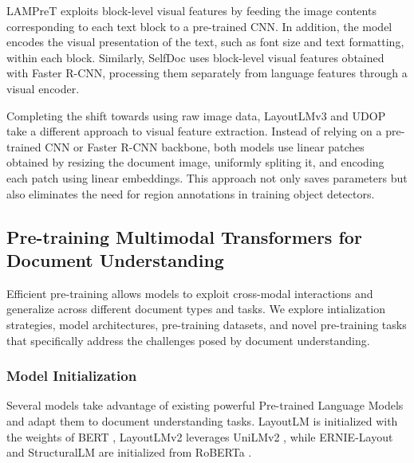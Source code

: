 \ac{LAMPreT} \citep{wu2021lampret} exploits block-level visual features by feeding the image contents corresponding to each text block to a pre-trained \ac{CNN}. In addition, the model encodes the visual presentation of the text, such as font size and text formatting, within each block. Similarly, SelfDoc \citep{li2021selfdoc} uses block-level visual features obtained with Faster R-CNN, processing them separately from language features through a visual encoder.  

Completing the shift towards using raw image data, LayoutLMv3 \citep{huang2022layoutlmv3} and UDOP \citep{tang2023unifying} take a different approach to visual feature extraction. Instead of relying on a pre-trained \ac{CNN} or Faster R-CNN backbone, both models use linear patches obtained by resizing the document image, uniformly spliting it, and encoding each patch using linear embeddings. This approach not only saves parameters but also eliminates the need for region annotations in training object detectors.



\subsection{Pre-training Multimodal Transformers for Document Understanding}
\label{section:related-document-understanding-pretraining}

Efficient pre-training allows models to exploit cross-modal interactions and generalize across different document types and tasks. We explore intialization strategies, model architectures, pre-training datasets, and novel pre-training tasks that specifically address the challenges posed by document understanding.

\subsubsection{Model Initialization} 

Several models take advantage of existing powerful Pre-trained Language Models and adapt them to document understanding tasks. LayoutLM \citep{xu2020layoutlm} is initialized with the weights of \ac{BERT} \citep{devlin2018bert}, LayoutLMv2 \citep{xu2020layoutlmv2} leverages UniLMv2 \citep{bao2020unilmv2}, while ERNIE-Layout \citep{peng2022ernie} and StructuralLM \citep{li2021structurallm} are initialized from RoBERTa \citep{liu2019roberta}.

